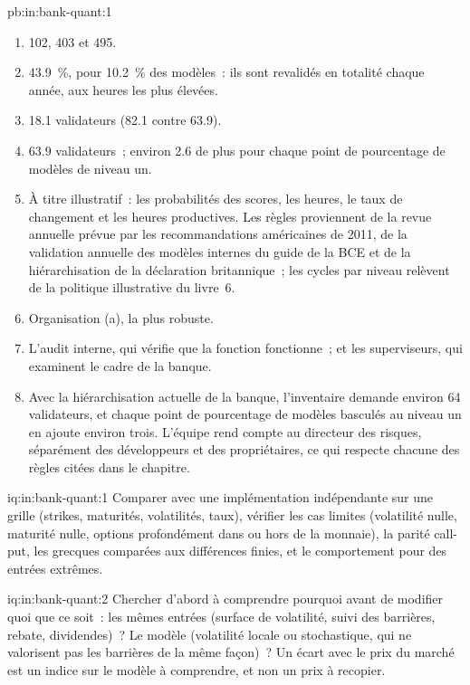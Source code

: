 \begin{solution}{pb:in:bank-quant:1}
\begin{enumerate}
(tous les deux ans), en dessous au niveau trois (tous les trois ans).
\item 102, 403 et 495.
\item 43.9~\%, pour 10.2~\% des modèles~: ils sont revalidés en totalité chaque année, aux heures les plus élevées.
\item 18.1 validateurs (82.1 contre 63.9).
\item 63.9 validateurs~; environ 2.6 de plus pour chaque point de pourcentage de modèles de niveau un.
\item À titre illustratif~: les probabilités des scores, les heures, le taux de changement et les heures productives. Les règles proviennent de la revue annuelle
prévue par les recommandations américaines de 2011, de la validation annuelle des modèles internes du guide de la BCE et de la hiérarchisation de la déclaration britannique~; les
cycles par niveau relèvent de la politique illustrative du livre~6.
\item Organisation (a), la plus robuste.
\item L'audit interne, qui vérifie que la fonction fonctionne~; et les superviseurs, qui examinent le cadre de la banque.
\item Avec la hiérarchisation actuelle de la banque, l'inventaire demande environ 64 validateurs, et chaque point de pourcentage de modèles basculés
au niveau un en ajoute environ trois. L'équipe rend compte au directeur des risques, séparément des développeurs et des
propriétaires, ce qui respecte chacune des règles citées dans le chapitre.
\end{enumerate}
\end{solution}

\begin{solution}{iq:in:bank-quant:1}
Comparer avec une implémentation indépendante sur une grille (strikes, maturités, volatilités, taux), vérifier les cas limites (volatilité nulle,
maturité nulle, options profondément dans ou hors de la monnaie), la parité call-put, les grecques comparées aux différences finies, et
le comportement pour des entrées extrêmes.
\end{solution}

\begin{solution}{iq:in:bank-quant:2}
Chercher d'abord à comprendre pourquoi avant de modifier quoi que ce soit~: les mêmes entrées (surface de volatilité, suivi des barrières, rebate, dividendes)~? Le
modèle (volatilité locale ou stochastique, qui ne valorisent pas les barrières de la même façon)~? Un écart avec le prix du marché est un indice
sur le modèle à comprendre, et non un prix à recopier.
\end{solution}

